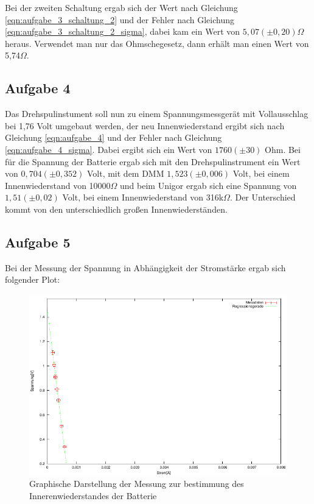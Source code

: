 \documentclass[12pt]{scrartcl}
\begin{document}
Bei der zweiten Schaltung ergab sich der Wert nach Gleichung \ref{eqn:aufgabe_3_schaltung_2} und der Fehler nach Gleichung \ref{eqn:aufgabe_3_schaltung_2_sigma}, dabei kam ein Wert von $5,07 (\pm 0,20)\Omega$ heraus.
Verwendet man nur das Ohmschegesetz, dann erhält man einen Wert von 5,74$\Omega$.

\subsection{Aufgabe 4}
Das Drehspulinstument soll nun zu einem Spannungsmessgerät mit Vollausschlag bei 1,76 Volt umgebaut werden, der neu Innenwiederstand ergibt sich nach Gleichung \ref{eqn:aufgabe_4} und der Fehler nach Gleichung \ref{eqn:aufgabe_4_sigma}.
Dabei ergibt sich ein Wert von $1760 (\pm 30)$ Ohm.
Bei für die Spannung der Batterie ergab sich mit den Drehspulinstrument ein Wert von $0,704 (\pm 0,352)$ Volt, mit dem DMM $1,523 (\pm 0,006)$ Volt, bei einem Innenwiederstand von 10000$\Omega$ und beim Unigor ergab sich eine Spannung von $1,51 (\pm 0,02)$ Volt, bei einem Innenwiederstand von 316k$\Omega$.
Der Unterschied kommt von den unterschiedlich großen Innenwiederständen.

\subsection{Aufgabe 5}
Bei der Messung der Spannung in Abhängigkeit der Stromstärke ergab sich folgender Plot:

\begin{figure}[htbp] 
	 \centering
	   \includegraphics[scale = 1]{Wiederstand.pdf}
	 	\caption[Graphische Darstellung der Messung zur bestimmung des Innerenwiederstandes der Batterie]{Graphische Darstellung der Messung zur bestimmung des Innerenwiederstandes der Batterie}
	 \label{fig:aufgabe_5_plot}
\end{figure}
\end{document}
